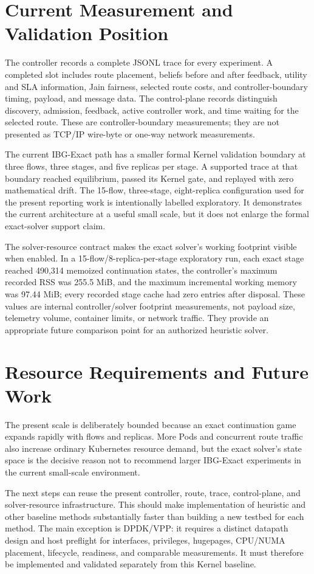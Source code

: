 \documentclass[12pt,a4paper]{article}
\begin{document}
\section{Current Measurement and Validation Position}
The controller records a complete JSONL trace for every experiment. A completed slot includes route placement, beliefs before and after feedback, utility and SLA information, Jain fairness, selected route costs, and controller-boundary timing, payload, and message data. The control-plane records distinguish discovery, admission, feedback, active controller work, and time waiting for the selected route. These are controller-boundary measurements; they are not presented as TCP/IP wire-byte or one-way network measurements.

The current IBG-Exact path has a smaller formal Kernel validation boundary at three flows, three stages, and five replicas per stage. A supported trace at that boundary reached equilibrium, passed its Kernel gate, and replayed with zero mathematical drift. The 15-flow, three-stage, eight-replica configuration used for the present reporting work is intentionally labelled exploratory. It demonstrates the current architecture at a useful small scale, but it does not enlarge the formal exact-solver support claim.

The solver-resource contract makes the exact solver's working footprint visible when enabled. In a 15-flow/8-replica-per-stage exploratory run, each exact stage reached 490,314 memoized continuation states, the controller's maximum recorded RSS was 255.5 MiB, and the maximum incremental working memory was 97.44 MiB; every recorded stage cache had zero entries after disposal. These values are internal controller/solver footprint measurements, not payload size, telemetry volume, container limits, or network traffic. They provide an appropriate future comparison point for an authorized heuristic solver.

\section{Resource Requirements and Future Work}
The present scale is deliberately bounded because an exact continuation game expands rapidly with flows and replicas. More Pods and concurrent route traffic also increase ordinary Kubernetes resource demand, but the exact solver's state space is the decisive reason not to recommend larger IBG-Exact experiments in the current small-scale environment.

The next steps can reuse the present controller, route, trace, control-plane, and solver-resource infrastructure. This should make implementation of heuristic and other baseline methods substantially faster than building a new testbed for each method. The main exception is DPDK/VPP: it requires a distinct datapath design and host preflight for interfaces, privileges, hugepages, CPU/NUMA placement, lifecycle, readiness, and comparable measurements. It must therefore be implemented and validated separately from this Kernel baseline.
\end{document}
